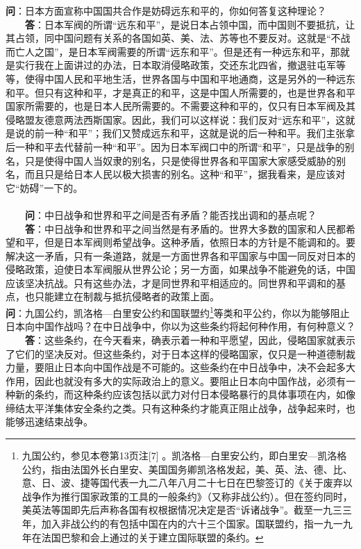 \documentclass[cn,11pt,chinese]{elegantbook}
\begin{document}
\textbf{问}：日本方面宣称中国国共合作是妨碍远东和平的，你如何答复这种理论？\\
　　\textbf{答}：日本军阀的所谓“远东和平”，是说日本占领中国，而中国则不要抵抗，让其占领，同中国问题有关系的各国如英、美、法、苏等也不要反对。这就是“不战而亡人之国”，是日本军阀需要的所谓“远东和平”。但是还有一种远东和平，那就是实行我在上面讲过的办法，日本取消侵略政策，交还东北四省，撤退驻屯军等等，使得中国人民和平地生活，世界各国与中国和平地通商，这是另外的一种远东和平。但只有这种和平，才是真正的和平，这是中国人所需要的，也是世界各和平国家所需要的，也是日本人民所需要的。不需要这种和平的，仅只有日本军阀及其侵略盟友德意两法西斯国家。因此，我们可以这样说：我们反对“远东和平”，这就是说的前一种“和平”；我们又赞成远东和平，这就是说的后一种和平。我们主张拿后一种和平去代替前一种“和平”。因为日本军阀口中的所谓“和平”，只是战争的别名，只是使得中国人当奴隶的别名，只是使得世界各和平国家大家感受威胁的别名，而且只是给日本人民以极大损害的别名。这种“和平”，据我看来，是应该对它“妨碍”一下的。\\~\\
　　\textbf{问}：中日战争和世界和平之间是否有矛盾？能否找出调和的基点呢？\\
　　\textbf{答}：中日战争和世界和平之间当然是有矛盾的。世界大多数的国家和人民都希望和平，但是日本军阀则希望战争。这种矛盾，依照日本的方针是不能调和的。要解决这一矛盾，只有一条道路，就是一方面世界各和平国家与中国一同反对日本的侵略政策，迫使日本军阀服从世界公论；另一方面，如果战争不能避免的话，中国应该坚决抗战。只有这些办法，才是同世界和平相适应的。同世界和平调和的基点，也只能建立在制裁与抵抗侵略者的政策上面。\\


\textbf{问}：九国公约，凯洛格—白里安公约和国联盟约\footnote[14]{九国公约，参见本卷第13页注[7] 。凯洛格—白里安公约，即白里安—凯洛格公约，指由法国外长白里安、美国国务卿凯洛格发起，美、英、法、德、比、意、日、波、捷等国代表一九二八年八月二十七日在巴黎签订的《关于废弃以战争作为推行国家政策的工具的一般条约》（又称非战公约）。但在签约同时，美英法等国即先后声称各国有权根据情况决定是否“诉诸战争”。截至一九三三年，加入非战公约的有包括中国在内的六十三个国家。国联盟约，指一九一九年在法国巴黎和会上通过的关于建立国际联盟的条约。}等类和平公约，你以为能够阻止日本向中国作战吗？在中日战争中，你以为这些条约将起何种作用，有何种意义？\\
　　\textbf{答}：这些条约，在今天看来，确表示着一种和平愿望，因此，侵略国家就表示了它们的坚决反对。但这些条约，对于日本这样的侵略国家，仅只是一种道德制裁力量，要阻止日本向中国作战是不可能的。这些条约在中日战争中，决不会起多大作用，因此也就没有多大的实际政治上的意义。要阻止日本向中国作战，必须有一种新的条约，而这种条约应该包括以武力对付日本侵略暴行的具体事项在内，如像缔结太平洋集体安全条约之类。只有这种条约才能真正阻止战争，战争起来时，也能够迅速结束战争。\\
\end{document}
